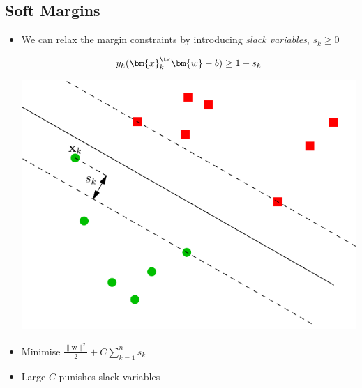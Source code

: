\begin{slide}
\section[-2]{Soft Margins}

\begin{PauseHighLight}
  \begin{itemize}
  \item We can relax the margin constraints by introducing \textit{slack
      variables}, $s_k\geq0$
    
    \begin{minipage}{10cm}
    \begin{align*}
      y_k (\bm{x}_k^\tr\bm{w} - b) \geq 1-s_k
    \end{align*}
    \end{minipage}\hfil%
    \begin{minipage}{11cm}
    \begin{center}
      \includegraphics[width=\linewidth]{slack-variables}\pause
    \end{center}
    \end{minipage}
  \item Minimise $\frac{\|\bm{w}\|^2}{2} + C \sum_{k=1}^n s_k$\pause
  \item Large $C$ punishes slack variables\pause
  \end{itemize}
\end{PauseHighLight}

\end{slide}


